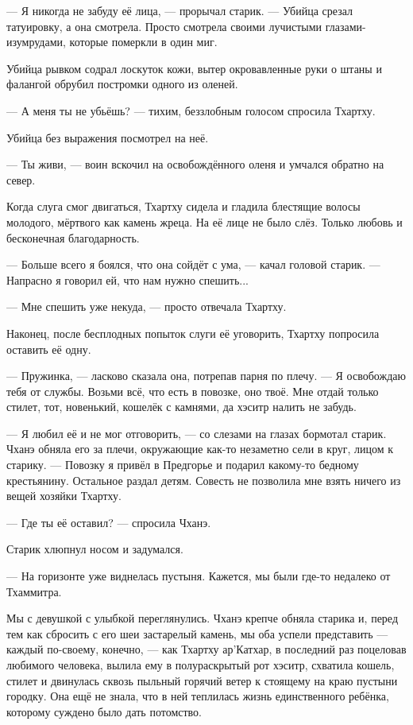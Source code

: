 --- Я никогда не забуду её лица, --- прорычал старик.
--- Убийца срезал татуировку, а она смотрела.
Просто смотрела своими лучистыми глазами-изумрудами, которые померкли в один миг.

Убийца рывком содрал лоскуток кожи, вытер окровавленные руки о штаны и фалангой обрубил постромки одного из оленей.

--- А меня ты не убьёшь? --- тихим, беззлобным голосом спросила Тхартху.

Убийца без выражения посмотрел на неё.

--- Ты живи, --- воин вскочил на освобождённого оленя и умчался обратно на север.

Когда слуга смог двигаться, Тхартху сидела и гладила блестящие волосы молодого, мёртвого как камень жреца.
На её лице не было слёз.
Только любовь и бесконечная благодарность.

--- Больше всего я боялся, что она сойдёт с ума, --- качал головой старик.
--- Напрасно я говорил ей, что нам нужно спешить...

--- Мне спешить уже некуда, --- просто отвечала Тхартху.

Наконец, после бесплодных попыток слуги её уговорить, Тхартху попросила оставить её одну.

--- Пружинка, --- ласково сказала она, потрепав парня по плечу.
--- Я освобождаю тебя от службы.
Возьми всё, что есть в повозке, оно твоё.
Мне отдай только стилет, тот, новенький, кошелёк с камнями, да хэситр налить не забудь.

--- Я любил её и не мог отговорить, --- со слезами на глазах бормотал старик.
Чханэ обняла его за плечи, окружающие как-то незаметно сели в круг, лицом к старику.
--- Повозку я привёл в Предгорье и подарил какому-то бедному крестьянину.
Остальное раздал детям.
Совесть не позволила мне взять ничего из вещей хозяйки Тхартху.

--- Где ты её оставил? --- спросила Чханэ.

Старик хлюпнул носом и задумался.

--- На горизонте уже виднелась пустыня.
Кажется, мы были где-то недалеко от Тхаммитра.

Мы с девушкой с улыбкой переглянулись.
Чханэ крепче обняла старика и, перед тем как сбросить с его шеи застарелый камень, мы оба успели представить --- каждый по-своему, конечно, --- как Тхартху ар’Катхар, в последний раз поцеловав любимого человека, вылила ему в полураскрытый рот хэситр, схватила кошель, стилет и двинулась сквозь пыльный горячий ветер к стоящему на краю пустыни городку.
Она ещё не знала, что в ней теплилась жизнь единственного ребёнка, которому суждено было дать потомство.

